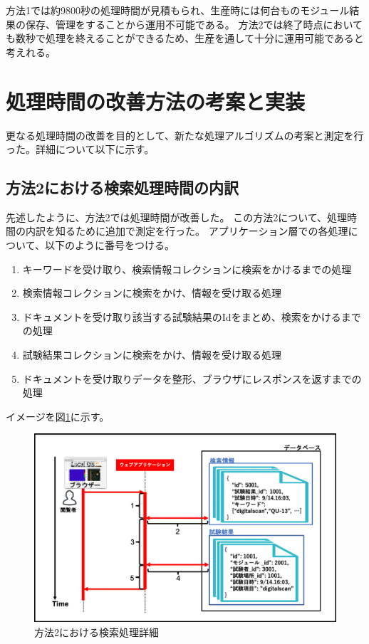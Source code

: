方法1では約9800秒の処理時間が見積もられ、生産時には何台ものモジュール結果の保存、管理をすることから運用不可能である。
方法2では終了時点においても数秒で処理を終えることができるため、生産を通して十分に運用可能であると考えれる。
 
\newpage
\section{処理時間の改善方法の考案と実装}

更なる処理時間の改善を目的として、新たな処理アルゴリズムの考案と測定を行った。詳細について以下に示す。

\subsection{方法2における検索処理時間の内訳}
先述したように、方法2では処理時間が改善した。
この方法2について、処理時間の内訳を知るために追加で測定を行った。
アプリケーション層での各処理について、以下のように番号をつける。
\begin{enumerate}
  \item キーワードを受け取り、検索情報コレクションに検索をかけるまでの処理
  \item 検索情報コレクションに検索をかけ、情報を受け取る処理
  \item ドキュメントを受け取り該当する試験結果のIdをまとめ、検索をかけるまでの処理
  \item 試験結果コレクションに検索をかけ、情報を受け取る処理
  \item ドキュメントを受け取りデータを整形、ブラウザにレスポンスを返すまでの処理
\end{enumerate}

イメージを図\ref{search_mongo_collection_details}に示す。

\begin{figure}[bpt]
  \begin{center}
    \includegraphics[width=14cm]{search_mongo_collection_details}
  \caption[方法2における検索処理詳細]{方法2における検索処理詳細}
  \label{search_mongo_collection_details}
  \end{center}
\end{figure}

